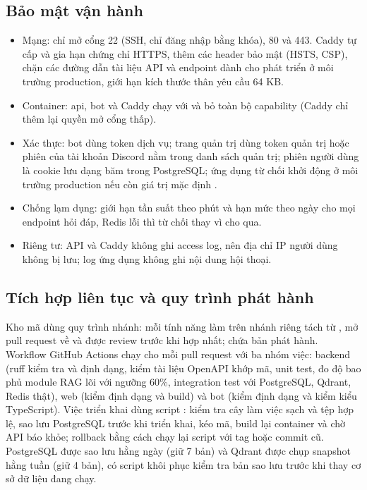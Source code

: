 \subsection{Bảo mật vận hành}
\label{sec:security}

\begin{itemize}
    \item Mạng: chỉ mở cổng 22 (SSH, chỉ đăng nhập bằng khóa), 80 và 443. Caddy tự cấp và gia hạn chứng chỉ HTTPS, thêm các header bảo mật (HSTS, CSP), chặn các đường dẫn tài liệu API và endpoint dành cho phát triển ở môi trường production, giới hạn kích thước thân yêu cầu 64 KB.
    \item Container: api, bot và Caddy chạy với  và bỏ toàn bộ capability (Caddy chỉ thêm lại quyền mở cổng thấp).
    \item Xác thực: bot dùng token dịch vụ; trang quản trị dùng token quản trị hoặc phiên của tài khoản Discord nằm trong danh sách quản trị; phiên người dùng là cookie  lưu dạng băm trong PostgreSQL; ứng dụng từ chối khởi động ở môi trường production nếu còn giá trị mặc định .
    \item Chống lạm dụng: giới hạn tần suất theo phút và hạn mức theo ngày cho mọi endpoint hỏi đáp, Redis lỗi thì từ chối thay vì cho qua.
    \item Riêng tư: API và Caddy không ghi access log, nên địa chỉ IP người dùng không bị lưu; log ứng dụng không ghi nội dung hội thoại.
\end{itemize}

\subsection{Tích hợp liên tục và quy trình phát hành}
\label{sec:ci}

Kho mã dùng quy trình nhánh: mỗi tính năng làm trên nhánh riêng tách từ , mở pull request về  và được review trước khi hợp nhất;  chứa bản phát hành. Workflow GitHub Actions chạy cho mỗi pull request với ba nhóm việc: backend (ruff kiểm tra và định dạng, kiểm tài liệu OpenAPI khớp mã, unit test, đo độ bao phủ module RAG lõi với ngưỡng 60\%, integration test với PostgreSQL, Qdrant, Redis thật), web (kiểm định dạng và build) và bot (kiểm định dạng và kiểm kiểu TypeScript). Việc triển khai dùng script : kiểm tra cây làm việc sạch và tệp  hợp lệ, sao lưu PostgreSQL trước khi triển khai, kéo mã, build lại container và chờ API báo khỏe; rollback bằng cách chạy lại script với tag hoặc commit cũ. PostgreSQL được sao lưu hằng ngày (giữ 7 bản) và Qdrant được chụp snapshot hằng tuần (giữ 4 bản), có script khôi phục kiểm tra bản sao lưu trước khi thay cơ sở dữ liệu đang chạy.


